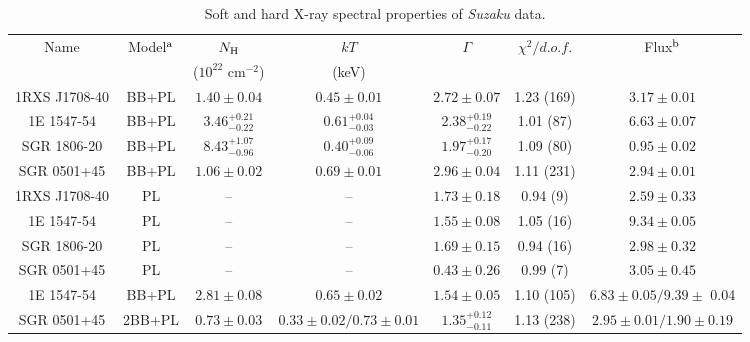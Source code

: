\documentclass[]{raa}
\begin{document}
\begin{table}
\bc
\begin{minipage}[]{100mm}
\caption[]{{Soft and hard X-ray spectral properties of {\it Suzaku} data. } 
\label{fit_bp}}
\setlength{\tabcolsep}{3pt}
\end{minipage}
 \begin{tabular}{ccccccc}
  \hline \hline \noalign{\smallskip}
Name & Model$^{\rm a}$ &  $N_{\rm H}$ & $kT$ & $\Gamma$ & $\chi^2/d.o.f.$ & Flux$^{\rm b}$\\
 & & ($10^{22}$ cm$^{-2}$) & (keV) \\
  \hline\noalign{\smallskip}  
1RXS J1708-40 & BB+PL & $1.40 \pm 0.04$ & $0.45\pm 0.01$ & $2.72 \pm 0.07$ & 1.23 (169) & $3.17 \pm 0.01$  \\%
1E 1547-54 & BB+PL & $3.46_{-0.22}^{+0.21}$ & $0.61_{-0.03}^{+0.04}$ & $2.38_{-0.22}^{+0.19}$ & 1.01 (87) & $6.63 \pm 0.07$ \\%
SGR 1806-20 & BB+PL & $8.43_{-0.96}^{+1.07}$ & $0.40^{+0.09}_{-0.06}$ & $1.97_{-0.20}^{+0.17}$ & 1.09 (80) & $0.95 \pm 0.02$ \\%
SGR 0501+45 & BB+PL & $1.06 \pm 0.02$ & $0.69 \pm 0.01$ & $2.96 \pm 0.04$ & 1.11 (231) & $2.94 \pm 0.01$ \\
\hline \noalign{\smallskip}
1RXS J1708-40 & PL & -- & -- & $1.73 \pm 0.18$ & 0.94 (9) & $2.59 \pm 0.33$ \\
1E 1547-54 & PL & -- & -- & $1.55 \pm 0.08$ & 1.05 (16) & $9.34 \pm 0.05$\\
SGR 1806-20 & PL & -- & -- & $1.69 \pm 0.15$ & 0.94 (16) & $2.98 \pm 0.32$ \\
SGR 0501+45 & PL & -- & -- & $0.43 \pm 0.26$ & 0.99 (7) & $3.05 \pm 0.45$\\
\hline \noalign{\smallskip}
1E 1547-54 & BB+PL & $2.81 \pm 0.08$ & $0.65 \pm 0.02$ & $1.54 \pm 0.05$ & 1.10 (105) & $6.83 \pm 0.05/9.39 \pm$ 0.04 \\
SGR 0501+45 & 2BB+PL & $0.73 \pm 0.03$ & $0.33 \pm 0.02/0.73\pm 0.01$ & $1.35_{-0.11}^{+0.12}$ & 1.13 (238) & $2.95 \pm 0.01/1.90 \pm 0.19$ \\


\end{tabular}
\end{table}
\end{document}
